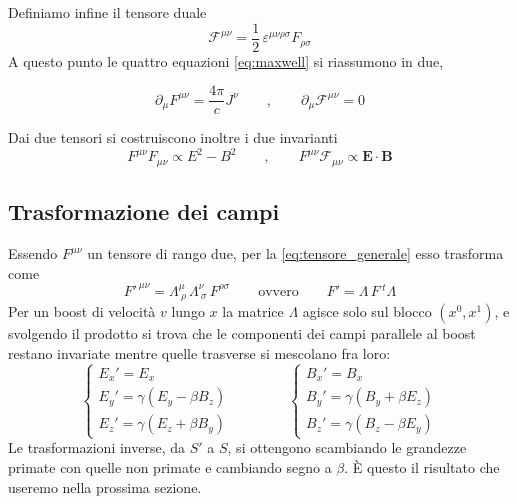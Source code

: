 Definiamo infine il tensore duale
%
\begin{equation}
    \mathcal{F}^{\mu\nu} = \frac{1}{2}\,\varepsilon^{\mu\nu\rho\sigma}F_{\rho\sigma}
    \label{eq:duale}
\end{equation}
A questo punto le quattro equazioni \eqref{eq:maxwell} si riassumono in due,
%
\begin{tcolorbox}[colback=black!5!white, colframe=black!45!white, boxrule=0.8pt]
\begin{equation}
    \partial_\mu F^{\mu\nu} = \frac{4\pi}{c}J^\nu \qquad , \qquad \partial_\mu \mathcal{F}^{\mu\nu} = 0
    \label{eq:maxwell_covariante}
\end{equation}
\end{tcolorbox}
Dai due tensori si costruiscono inoltre i due invarianti
%
\begin{equation}
    F^{\mu\nu}F_{\mu\nu} \propto E^2 - B^2 \qquad , \qquad F^{\mu\nu}\mathcal{F}_{\mu\nu} \propto \mathbf{E}\cdot\mathbf{B}
    \label{eq:invarianti}
\end{equation}

\subsection*{Trasformazione dei campi}

Essendo $F^{\mu\nu}$ un tensore di rango due, per la \eqref{eq:tensore_generale} esso trasforma come
%
\begin{equation}
    F'^{\,\mu\nu} = \Lambda^\mu_{\ \rho}\,\Lambda^\nu_{\ \sigma}\,F^{\rho\sigma} \qquad \text{ovvero} \qquad F' = \Lambda\, F\, {}^{t}\Lambda
    \label{eq:trasf_F}
\end{equation}
Per un boost di velocità $v$ lungo $x$ la matrice $\Lambda$ agisce solo sul blocco $(x^0,x^1)$, e svolgendo il prodotto si trova che le componenti dei campi parallele al boost restano invariate mentre quelle trasverse si mescolano fra loro:
%
\begin{equation}
\left\{\begin{array}{l}
E_x' = E_x \\
E_y' = \gamma\left(E_y - \beta B_z\right) \\
E_z' = \gamma\left(E_z + \beta B_y\right)
\end{array}\right.
\qquad\qquad
\left\{\begin{array}{l}
B_x' = B_x \\
B_y' = \gamma\left(B_y + \beta E_z\right) \\
B_z' = \gamma\left(B_z - \beta E_y\right)
\end{array}\right.
\label{eq:trasf_campi}
\end{equation}
Le trasformazioni inverse, da $S'$ a $S$, si ottengono scambiando le grandezze primate con quelle non primate e cambiando segno a $\beta$. È questo il risultato che useremo nella prossima sezione.

